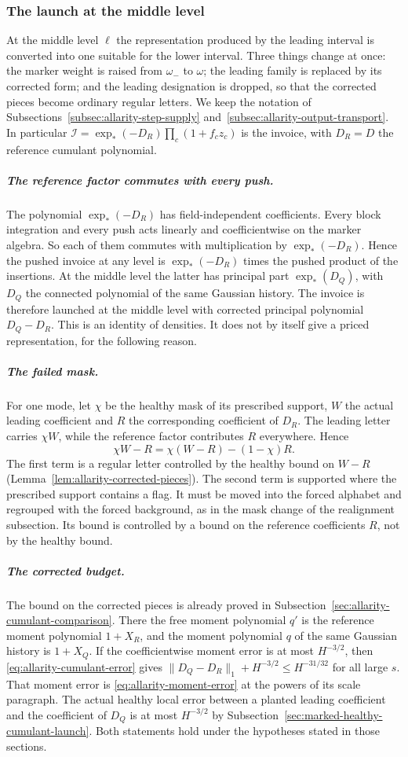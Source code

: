 \subsubsection{The launch at the middle level}
\label{subsec:allarity-corrected-budget}

At the middle level $\ell$ the representation produced by the leading
interval is converted into one suitable for the lower interval. Three
things change at once: the marker weight is raised from $\omega_-$ to
$\omega$; the leading family is replaced by its corrected form; and the
leading designation is dropped, so that the corrected pieces become
ordinary regular letters. We keep the notation of
Subsections~\ref{subsec:allarity-step-supply}
and~\ref{subsec:allarity-output-transport}. In particular
$\mathcal I=\exp_*(-D_R)\prod_c(1+f_cz_c)$ is the invoice, with $D_R=D$ the
reference cumulant polynomial.

\subparagraph{The reference factor commutes with every push.}
The polynomial $\exp_*(-D_R)$ has field-independent coefficients. Every
block integration and every push acts linearly and coefficientwise on
the marker algebra. So each of them commutes with multiplication by
$\exp_*(-D_R)$. Hence the pushed invoice at any level is
$\exp_*(-D_R)$ times the pushed product of the insertions. At the middle
level the latter has principal part $\exp_*(D_Q)$, with $D_Q$ the
connected polynomial of the same Gaussian history. The invoice is
therefore launched at the middle level with corrected principal
polynomial $D_Q-D_R$. This is an identity of densities. It does not by
itself give a priced representation, for the following reason.

\subparagraph{The failed mask.}
For one mode, let $\chi$ be the healthy mask of its prescribed support,
$W$ the actual leading coefficient and $R$ the corresponding coefficient
of $D_R$. The leading letter carries $\chi W$, while the reference factor
contributes $R$ everywhere. Hence
\[
 \chi W-R=\chi(W-R)-(1-\chi)R .
\]
The first term is a regular letter controlled by the healthy bound on
$W-R$ (Lemma~\ref{lem:allarity-corrected-pieces}). The second term is
supported where the prescribed support contains a flag. It must be moved
into the forced alphabet and regrouped with the forced background, as in
the mask change of the realignment subsection. Its bound is controlled by
a bound on the reference coefficients $R$, not by the healthy bound.

\subparagraph{The corrected budget.}
The bound on the corrected pieces is already proved in
Subsection~\ref{sec:allarity-cumulant-comparison}. There the free moment
polynomial $q'$ is the reference moment polynomial $1+X_R$, and the
moment polynomial $q$ of the same Gaussian history is $1+X_Q$. If the
coefficientwise moment error is at most $H^{-3/2}$, then
\eqref{eq:allarity-cumulant-error} gives
$\|D_Q-D_R\|_1+H^{-3/2}\le H^{-31/32}$ for all large $s$. That moment
error is \eqref{eq:allarity-moment-error} at the powers of its scale
paragraph. The actual healthy local error between a planted leading
coefficient and the coefficient of $D_Q$ is at most $H^{-3/2}$ by
Subsection~\ref{sec:marked-healthy-cumulant-launch}. Both statements hold
under the hypotheses stated in those sections.

